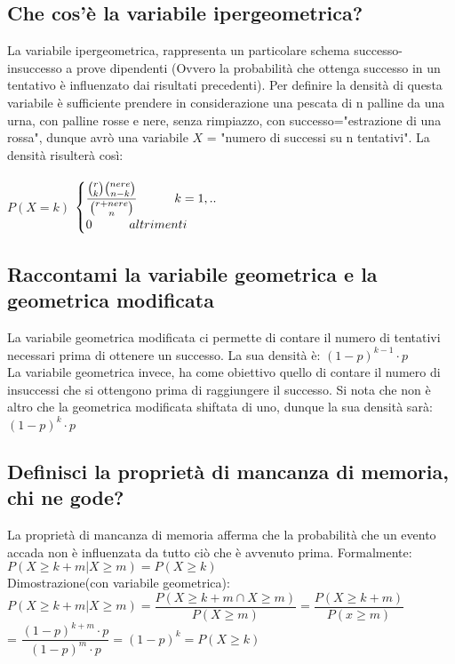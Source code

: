 \documentclass[a4paper,12pt]{report}
\begin{document}
	\subsection{Che cos'è la variabile ipergeometrica?}
	La variabile ipergeometrica, rappresenta un particolare schema successo-insuccesso a prove dipendenti (Ovvero la probabilità che ottenga successo in un tentativo è influenzato dai risultati precedenti). Per definire la densità di questa variabile è sufficiente prendere in considerazione una pescata di n palline da una urna, con palline rosse e nere, senza rimpiazzo, con successo="estrazione di una rossa", dunque avrò una variabile $X$ = "numero di successi su n tentativi".
	La densità risulterà così: \\ \\ $P(X = k)$
	$
	\begin{cases}
		\dfrac{\binom{r}{k} \binom{nere}{n - k}}{\binom{r + nere}{n}}\qquad\quad k = 1, .. \\  
		0\qquad\quad	altrimenti \\
	\end{cases} \\
	$
	\subsection{Raccontami la variabile geometrica e la geometrica modificata}
	La variabile geometrica modificata ci permette di contare il numero di tentativi necessari prima di ottenere un successo.
	La sua densità è: $(1-p)^{k - 1} \cdot p$ \\
	La variabile geometrica invece, ha come obiettivo quello di contare il numero di insuccessi che si ottengono prima di raggiungere il successo. Si nota che non è altro che la geometrica modificata shiftata di uno, dunque la sua densità sarà: $(1 - p)^k \cdot p$
	\subsection{Definisci la proprietà di mancanza di memoria, chi ne gode?}
	La proprietà di mancanza di memoria afferma che la probabilità che un evento accada non è influenzata da tutto ciò che è avvenuto prima. Formalmente:
	$P(X \geq k + m | X \geq m) = P(X \ge k)$ \\
	Dimostrazione(con variabile geometrica):\\
	$P(X \geq k + m | X \geq m) = \dfrac{P(X \geq k + m \cap X \geq m)}{P(X \geq m)} = \dfrac{P(X \geq k + m)}{P(x \geq m)}$\\
	= $\dfrac{(1-p)^{k + m} \cdot p }{(1-p)^m \cdot p} = (1-p)^k = P(X \geq k)$
\end{document}
